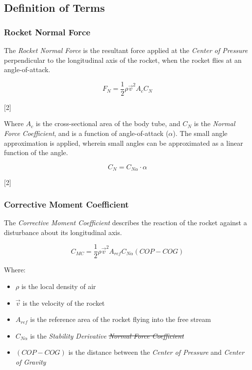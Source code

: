 \documentclass[]{article}
\providecommand{\tightlist}{%
  \setlength{\itemsep}{0pt}\setlength{\parskip}{0pt}}
\begin{document}
\subsection{Definition of Terms}\label{definition-of-terms}

\subsubsection{Rocket Normal Force}\label{rocket-normal-force}

The \emph{Rocket Normal Force} is the resultant force applied at the
\emph{Center of Pressure} perpendicular to the longitudinal axis of the
rocket, when the rocket flies at an angle-of-attack.

\begin{equation}
\label{rocket_normal_force}
F_{N} = \dfrac{1}{2} \rho \vec{v}^2 A_{c} C_N
\end{equation}

{[}2{]}

Where \(A_c\) is the cross-sectional area of the body tube, and \(C_N\)
is the \emph{Normal Force Coefficient}, and is a function of
angle-of-attack (\(\alpha\)). The small angle approximation is applied,
wherein small angles can be approximated as a linear function of the
angle.

\begin{equation}
\label{normal_force_coefficient}
C_N = C_{N \alpha} \cdot \alpha
\end{equation}

{[}2{]}

\subsubsection{Corrective Moment
Coefficient}\label{corrective-moment-coefficient}

The \emph{Corrective Moment Coefficient} describes the reaction of the
rocket against a disturbance about its longitudinal axis.

\begin{equation}
\label{eq_coef_moment_corrective}
C_{MC} = \dfrac{1}{2} \rho \vec{v}^2 A_{ref} C_{N \alpha} (COP-COG)
\end{equation}

Where:

\begin{itemize}
\tightlist
\item
  \(\rho\) is the local density of air
\item
  \(\vec{v}\) is the velocity of the rocket
\item
  \(A_{ref}\) is the reference area of the rocket flying into the free
  stream
\item
  \(C_{N \alpha}\) is the \emph{Stability Derivative} \sout{\emph{Normal
  Force Coefficient}}
\item
  \((COP-COG)\) is the distance between the \emph{Center of Pressure}
  and \emph{Center of Gravity}
\end{itemize}
\end{document}
